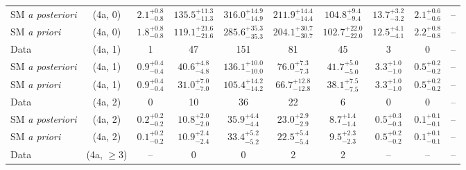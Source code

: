 \begin{table}[h!]
{\begin{tabular}{lccccccccc}
	SM {\it a posteriori} & (4a, 0)           & $2.1^{+ 0.8 }_{- 0.8 }$        & $135.5^{+ 11.3 }_{- 11.3 }$    & $316.0^{+ 14.9 }_{- 14.9 }$ & $211.9^{+ 14.4 }_{- 14.4 }$ & $104.8^{+ 9.4 }_{- 9.4 }$   & $13.7^{+ 3.2 }_{- 3.2 }$ & $2.1^{+ 0.6 }_{- 0.6 }$  & --           \\[0.5ex] 
	SM {\it a priori}     & (4a, 0)           & $1.8^{+ 0.8 }_{- 0.8 }$        & $119.1^{+ 21.6 }_{- 21.6 }$    & $285.6^{+ 35.3 }_{- 35.3 }$ & $204.1^{+ 30.7 }_{- 30.7 }$ & $102.7^{+ 22.0 }_{- 22.0 }$ & $12.5^{+ 4.1 }_{- 4.1 }$ & $2.2^{+ 0.8 }_{- 0.8 }$  & --           \\[0.5ex] 
	Data                  & (4a, 1)           & 1                              & 47                             & 151                         & 81                          & 45                          & 3                        & 0                        & --           \\[0.5ex] 
	SM {\it a posteriori} & (4a, 1)           & $0.9^{+ 0.4 }_{- 0.4 }$        & $40.6^{+ 4.8 }_{- 4.8 }$       & $136.1^{+ 10.0 }_{- 10.0 }$ & $76.0^{+ 7.3 }_{- 7.3 }$    & $41.7^{+ 5.0 }_{- 5.0 }$    & $3.3^{+ 1.0 }_{- 1.0 }$  & $0.5^{+ 0.2 }_{- 0.2 }$  & --           \\[0.5ex] 
	SM {\it a priori}     & (4a, 1)           & $0.9^{+ 0.4 }_{- 0.4 }$        & $31.0^{+ 7.0 }_{- 7.0 }$       & $105.4^{+ 14.2 }_{- 14.2 }$ & $66.7^{+ 12.8 }_{- 12.8 }$  & $38.1^{+ 7.5 }_{- 7.5 }$    & $3.3^{+ 1.0 }_{- 1.0 }$  & $0.5^{+ 0.2 }_{- 0.2 }$  & --           \\[0.5ex] 
	Data                  & (4a, 2)           & 0                              & 10                             & 36                          & 22                          & 6                           & 0                        & 0                        & --           \\[0.5ex] 
	SM {\it a posteriori} & (4a, 2)           & $0.2^{+ 0.2 }_{- 0.2 }$        & $10.8^{+ 2.0 }_{- 2.0 }$       & $35.9^{+ 4.4 }_{- 4.4 }$    & $23.0^{+ 2.9 }_{- 2.9 }$    & $8.7^{+ 1.4 }_{- 1.4 }$     & $0.5^{+ 0.3 }_{- 0.3 }$  & $0.1^{+ 0.1 }_{- 0.1 }$  & --           \\[0.5ex] 
	SM {\it a priori}     & (4a, 2)           & $0.1^{+ 0.2 }_{- 0.2 }$        & $10.9^{+ 2.4 }_{- 2.4 }$       & $33.4^{+ 5.2 }_{- 5.2 }$    & $22.5^{+ 5.4 }_{- 5.4 }$    & $9.5^{+ 2.3 }_{- 2.3 }$     & $0.5^{+ 0.2 }_{- 0.2 }$  & $0.1^{+ 0.1 }_{- 0.1 }$  & --           \\[0.5ex] 
	Data                  & (4a, $\ge3$)      & --                             & 0                              & 0                           & 2                           & 2                           & --                       & --                       & --           \\[0.5ex] 

\end{tabular}}
\end{table}

